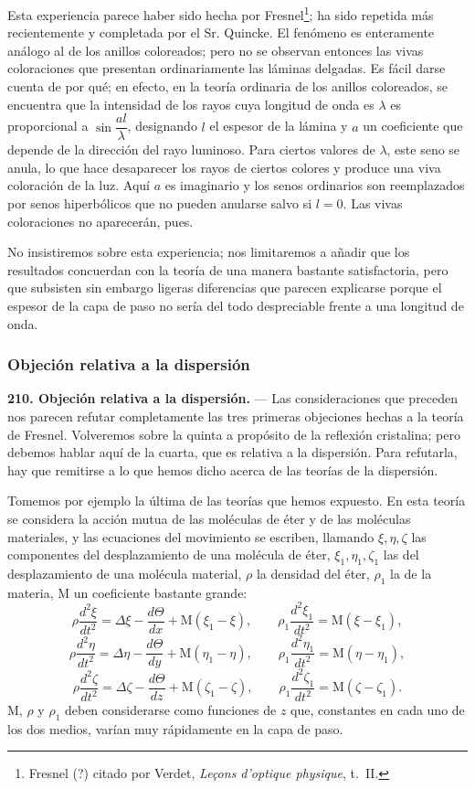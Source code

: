 Esta experiencia parece haber sido hecha por Fresnel\footnote{Fresnel
(?) citado por Verdet, \emph{Leçons d'optique physique}, t.~II.}; ha sido
repetida más recientemente y completada por el Sr. Quincke. El fenómeno es
enteramente análogo al de los anillos coloreados; pero no se observan
entonces las vivas coloraciones que presentan ordinariamente las láminas
delgadas. Es fácil darse cuenta de por qué; en efecto, en la teoría
ordinaria de los anillos coloreados, se encuentra que la intensidad de los
rayos cuya longitud de onda es $\lambda$ es proporcional a
$\sin\dfrac{al}{\lambda}$, designando $l$ el espesor de la lámina y $a$ un
coeficiente que depende de la dirección del rayo luminoso. Para ciertos
valores de $\lambda$, este seno se anula, lo que hace desaparecer los
rayos de ciertos colores y produce una viva coloración de la luz. Aquí
$a$ es imaginario y los senos ordinarios son reemplazados por senos
hiperbólicos que no pueden anularse salvo si $l=0$. Las vivas coloraciones
no aparecerán, pues.

No insistiremos sobre esta experiencia; nos limitaremos a añadir que los
resultados concuerdan con la teoría de una manera bastante satisfactoria,
pero que subsisten sin embargo ligeras diferencias que parecen explicarse
porque el espesor de la capa de paso no sería del todo despreciable frente
a una longitud de onda.

\subsubsection{Objeción relativa a la dispersión}

\noindent\textbf{210. Objeción relativa a la dispersión.} — Las
consideraciones que preceden nos parecen refutar completamente las tres
primeras objeciones hechas a la teoría de Fresnel. Volveremos sobre la
quinta a propósito de la reflexión cristalina; pero debemos hablar aquí
de la cuarta, que es relativa a la dispersión. Para refutarla, hay que
remitirse a lo que hemos dicho acerca de las teorías de la dispersión.

Tomemos por ejemplo la última de las teorías que hemos expuesto. En esta
teoría se considera la acción mutua de las moléculas de éter y de las
moléculas materiales, y las ecuaciones del movimiento se escriben, llamando
$\xi,\eta,\zeta$ las componentes del desplazamiento de una molécula de
éter, $\xi_1,\eta_1,\zeta_1$ las del desplazamiento de una molécula
material, $\rho$ la densidad del éter, $\rho_1$ la de la materia, M un
coeficiente bastante grande:
\[
\rho\frac{d^2\xi}{dt^2}=\Delta\xi-\frac{d\Theta}{dx}+\mathrm{M}(\xi_1-\xi),
\qquad
\rho_1\frac{d^2\xi_1}{dt^2}=\mathrm{M}(\xi-\xi_1),
\]
\[
\rho\frac{d^2\eta}{dt^2}=\Delta\eta-\frac{d\Theta}{dy}+\mathrm{M}(\eta_1-\eta),
\qquad
\rho_1\frac{d^2\eta_1}{dt^2}=\mathrm{M}(\eta-\eta_1),
\]
\[
\rho\frac{d^2\zeta}{dt^2}=\Delta\zeta-\frac{d\Theta}{dz}+\mathrm{M}(\zeta_1-\zeta),
\qquad
\rho_1\frac{d^2\zeta_1}{dt^2}=\mathrm{M}(\zeta-\zeta_1).
\]
M, $\rho$ y $\rho_1$ deben considerarse como funciones de $z$ que,
constantes en cada uno de los dos medios, varían muy rápidamente en la
capa de paso.

